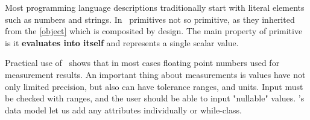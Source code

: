 \clearpage
{}\label{prim}\secdown

Most programming language descriptions traditionally start with literal elements
such as numbers and strings. In \mel\ primitives not so primitive, as they
inherited from the  \ref{object} which is composited by design.
The main property of primitive is it \textbf{evaluates into itself} and
represents a single scalar value.

\bigskip
{}

\clearpage
{}\label{nil}


\label{name}


\clearpage
{}\label{string}


\clearpage
{}\label{number}

Practical use of \mel\ shows that in most cases floating point numbers used for
measurement results. An important thing about measurements is values have not
only limited precision, but also can have tolerance ranges, and units. Input
must be checked with ranges, and the user should be able to input "nullable"
values. \mel 's data model let us add any attributes
individually or while-class.


{}

\label{integer}


\secup
